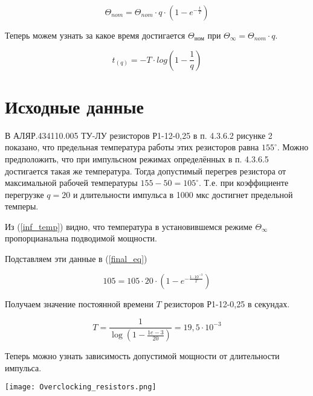 \documentclass[a4paper]{article}
\begin{document}
\begin{equation}
\label{overpowered_eq}
\Theta_{nom} = \Theta_{nom}{\cdot}q{\cdot}(1-e^{-\frac{t}{T}})
\end{equation}

Теперь можем узнать за какое время достигается $\Theta_{ном}$ при
$\Theta_{\infty}=\Theta_{nom}{\cdot}q$.

\begin{equation}
\label{tpulse_eq}
    t_{(q)} = -T{\cdot}log(1-\frac1q)
\end{equation}

\section{Исходные данные}

	В АЛЯР.434110.005 ТУ-ЛУ \cite{alyr.434110.005} резисторов Р1-12-0,25 в п.
4.3.6.2 рисунке 2 показано, что предельная температура работы этих резисторов равна
$155^{\circ}$. Можно предположить, что при импульсном режимах определённых в п.
4.3.6.5 достигается такая же температура. Тогда допустимый перегрев резистора от
максимальной рабочей температуры $155-50=105^{\circ}$. Т.е. при коэффициенте
перегрузке $q=20$ и длительности импульса в 1000 мкс достигнет предельной темперы.

    Из (\ref{inf_temp}) видно, что температура в установившемся режиме
${\Theta}_{\infty}$ пропорцианальна подводимой мощности.

    Подставляем эти данные в (\ref{final_eq})

\begin{equation}
105 = 105{\cdot}20{\cdot}(1-e^{-\frac{1{\cdot}10^{-3}}{T}})
\end{equation}

    Получаем значение постоянной времени $T$ резисторов Р1-12-0,25 в секундах.

\begin{equation}
T=\frac{1}{\log{(1-\frac{1e-3}{20})}}=19,5{\cdot}10^{-3}
\end{equation}

% 

    Теперь можно узнать зависимость допустимой мощности от длительности импульса.

\texttt{[image: Overclocking\_resistors.png]}
\end{document}

